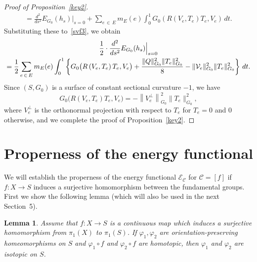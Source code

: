 \documentclass[11pt]{article}
\newtheorem{lemm}[theo]{Lemma}
\theoremstyle{definition}
\numberwithin{equation}{section}
\newcommand{\f}{\varphi}
\newcommand{\Cc}{\mathcal{C}}
\newcommand{\Ec}{\mathcal{E}}
\newcommand*\Vc{\mathcal{V}}
\begin{document}
\begin{proof}[{Proof of Proposition~\ref{key2}}]
\begin{multline*}
=\frac{d^2}{ds^2}E_{G_0}(h_s)\Big|_{s=0}+\sum_{e\,\in \,E}m_E(e)\int_0^1 G_0\left(R\left(V_e, T_e\right)T_e,V_e\right)\, dt.
\end{multline*}
Substituting these to~\eqref{svf3}, we obtain
\begin{multline*}
\frac{1}{2}\cdot \frac{d^2}{d s^2} E_{G_0}(h_{s})\Big{|}_{s=0}\\
=\frac{1}{2}\sum_{e\,\in\,E}m_E(e)\int_0^1\left\{G_0\big(R\left(V_e, T_e\right)T_e,V_e\big)+\frac{\|Q\|_{G_0}^2\|T_e\|_{G_0}^2}{8}-\|\Vc_e\|_{G_0}^2 \|T_e\|_{G_0}^2\right\}\, dt.
\end{multline*}
Since $(S,G_0)$ is a surface of constant sectional curvature $-1$, we have
\[
G_0\big(R(V_e, T_e)T_e,V_e\big)=-\left\|V_e^{\perp}\right\|^2_{G_0}\|T_e\|_{G_0}^2,
\]
where $V_e^{\perp}$ is the orthonormal projection with respect to $T_e$ for $T_e=0$ and $0$ otherwise, and we complete the proof of Proposition~\ref{key2}.
\end{proof}



\section{Properness of the energy functional}\label{Sec:proper}

We will establish the properness of the energy functional $\Ec_\Cc$ for $\Cc=[f]$ if $f:X \to S$ induces a surjective homomorphism between the fundamental groups. First we show the following lemma (which will also be used in the next Section~5).


\begin{lemm}\label{Lem:homotopic}
Assume that $f:X \to S$ is a continuous map which induces a surjective homomorphism from $\pi_1(X)$ to $\pi_1(S)$. If $\f_1, \f_2$ are orientation-preserving homeomorphisms on $S$ and $\f_1 \circ f$ and $\f_2 \circ f$ are homotopic, then $\f_1$ and $\f_2$ are isotopic on $S$.
\end{lemm}
\end{document}
